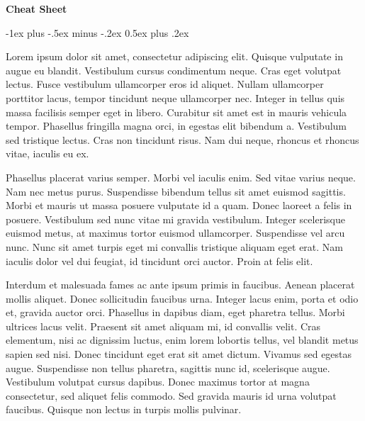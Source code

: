 \documentclass[10pt,landscape, a4paper]{article}
\makeatletter
\renewcommand{\section}{\@startsection{section}{1}{0mm}%
                                {-1ex plus -.5ex minus -.2ex}%
                                {0.5ex plus .2ex}%
                                {\normalfont\large\bfseries}}
\makeatother
\begin{document}
\raggedright
\footnotesize
\begin{multicols}{4}

\setlength{\premulticols}{1pt}
\setlength{\postmulticols}{1pt}
\setlength{\multicolsep}{1pt}
\setlength{\columnsep}{1pt}

\begin{center}
     \Large{\textbf{Cheat Sheet}} \\
\end{center}

\section{}

Lorem ipsum dolor sit amet, consectetur adipiscing elit. Quisque vulputate in augue eu blandit. Vestibulum cursus condimentum neque. Cras eget volutpat lectus. Fusce vestibulum ullamcorper eros id aliquet. Nullam ullamcorper porttitor lacus, tempor tincidunt neque ullamcorper nec. Integer in tellus quis massa facilisis semper eget in libero. Curabitur sit amet est in mauris vehicula tempor. Phasellus fringilla magna orci, in egestas elit bibendum a. Vestibulum sed tristique lectus. Cras non tincidunt risus. Nam dui neque, rhoncus et rhoncus vitae, iaculis eu ex.

Phasellus placerat varius semper. Morbi vel iaculis enim. Sed vitae varius neque. Nam nec metus purus. Suspendisse bibendum tellus sit amet euismod sagittis. Morbi et mauris ut massa posuere vulputate id a quam. Donec laoreet a felis in posuere. Vestibulum sed nunc vitae mi gravida vestibulum. Integer scelerisque euismod metus, at maximus tortor euismod ullamcorper. Suspendisse vel arcu nunc. Nunc sit amet turpis eget mi convallis tristique aliquam eget erat. Nam iaculis dolor vel dui feugiat, id tincidunt orci auctor. Proin at felis elit.

Interdum et malesuada fames ac ante ipsum primis in faucibus. Aenean placerat mollis aliquet. Donec sollicitudin faucibus urna. Integer lacus enim, porta et odio et, gravida auctor orci. Phasellus in dapibus diam, eget pharetra tellus. Morbi ultrices lacus velit. Praesent sit amet aliquam mi, id convallis velit. Cras elementum, nisi ac dignissim luctus, enim lorem lobortis tellus, vel blandit metus sapien sed nisi. Donec tincidunt eget erat sit amet dictum. Vivamus sed egestas augue. Suspendisse non tellus pharetra, sagittis nunc id, scelerisque augue. Vestibulum volutpat cursus dapibus. Donec maximus tortor at magna consectetur, sed aliquet felis commodo. Sed gravida mauris id urna volutpat faucibus. Quisque non lectus in turpis mollis pulvinar.


\end{multicols}
\end{document}
